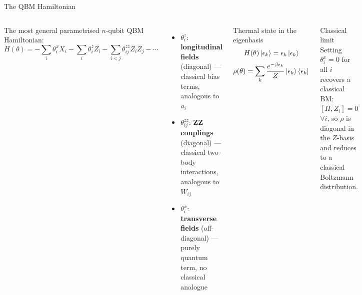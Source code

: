 \documentclass[aspectratio=169,10pt]{beamer}
\begin{document}
\begin{frame}{The QBM Hamiltonian}
  \begin{columns}[T]
      The most general parametrised $n$-qubit QBM Hamiltonian:
      \[
        H(\theta) = -\sum_i \theta_i^x X_i
                    -\sum_i \theta_i^z Z_i
                    -\sum_{i<j} \theta_{ij}^{zz} Z_i Z_j
                    - \cdots
      \]
      \begin{itemize}
        \item $\theta_i^z$: \textbf{longitudinal fields} (diagonal)
              — classical bias terms, analogous to $a_i$
        \item $\theta_{ij}^{zz}$: \textbf{ZZ couplings} (diagonal)
              — classical two-body interactions, analogous to $W_{ij}$
        \item $\theta_i^x$: \textbf{transverse fields}
              (off-diagonal) — \alert{purely quantum} term,
              no classical analogue
      \end{itemize}
      \begin{block}{Thermal state in the eigenbasis}
        \[
          H(\theta)\ket{\epsilon_k} = \epsilon_k\ket{\epsilon_k}
        \]
        \[
          \rho(\theta) = \sum_k
            \frac{e^{-\beta\epsilon_k}}{Z}\ket{\epsilon_k}\bra{\epsilon_k}
        \]
      \end{block}
      \vspace{0.2cm}
      \begin{block}{Classical limit}
        Setting $\theta_i^x = 0$ for all $i$ recovers a classical
        BM: $[H,Z_i]=0$ $\forall i$, so $\rho$ is diagonal in
        the $Z$-basis and reduces to a classical Boltzmann
        distribution.
      \end{block}
  \end{columns}
\end{frame}
\end{document}
